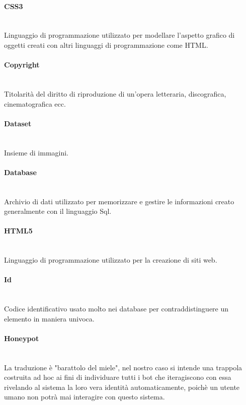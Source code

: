 \paragraph{CSS3}~\smallskip \\
Linguaggio di programmazione utilizzato per modellare l'aspetto grafico di oggetti creati con altri linguaggi di programmazione come HTML.

\paragraph{Copyright}~\smallskip \\
Titolarità del diritto di riproduzione di un'opera letteraria, discografica, cinematografica ecc.

\paragraph{Dataset}~\smallskip \\
Insieme di immagini.

\paragraph{Database}~\smallskip \\
Archivio di dati utilizzato per memorizzare e gestire le informazioni creato generalmente con il linguaggio Sql.

\paragraph{HTML5}~\smallskip \\
Linguaggio di programmazione utilizzato per la creazione di siti web.

\paragraph{Id}~\smallskip \\
Codice identificativo usato molto nei database per contraddistinguere un elemento in maniera univoca.

\paragraph{Honeypot}~\smallskip \\
La traduzione è "barattolo del miele", nel nostro caso si intende una trappola costruita ad hoc ai fini di individuare tutti i bot che iteragiscono con essa rivelando al sistema la loro vera identità automaticamente, poichè un utente umano non potrà mai interagire con questo sistema.

